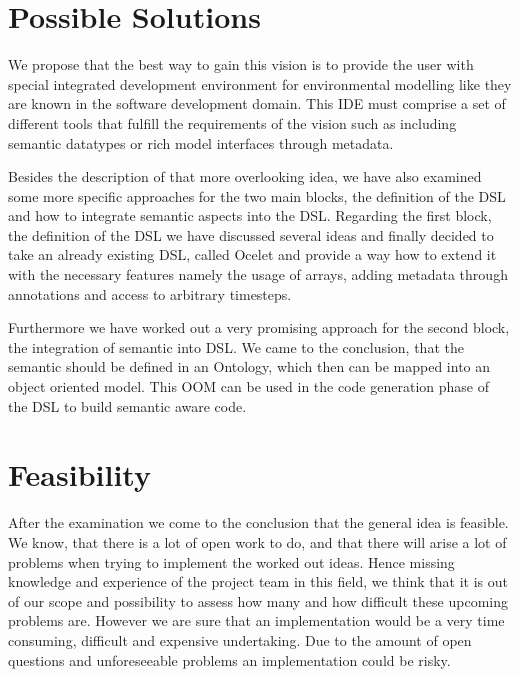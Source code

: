 \section*{Possible Solutions}
\par
We propose that the best way to gain this vision is to provide the user with special integrated development environment for environmental modelling like they are known in the software development domain. This IDE must comprise a set of different tools that fulfill the requirements of the vision such as including semantic datatypes or rich model interfaces through metadata.
\par
Besides the description of that more overlooking idea, we have also examined some more specific approaches for the two main blocks, the definition of the DSL and how to integrate semantic aspects into the DSL. Regarding the first block, the definition of the DSL we have discussed several ideas and finally decided to take an already existing DSL, called Ocelet and provide a way how to extend it with the necessary features namely the usage of arrays, adding metadata through annotations and access to arbitrary timesteps.
\par
Furthermore we have worked out a very promising approach for the second block, the integration of semantic into DSL. We came to the conclusion, that the semantic should be defined in an Ontology, which then can be mapped into an object oriented model. This OOM can be used in the code generation phase of the DSL to build semantic aware code.

\section*{Feasibility}
\par
After the examination we come to the conclusion that the general idea is feasible. We know, that there is a lot of open work to do, and that there will arise a lot of problems when trying to implement the worked out ideas. Hence missing knowledge and experience of the project team in this field, we think that it is out of our scope and possibility to assess how many and how difficult these upcoming problems are. However we are sure that an implementation would be a very time consuming, difficult and expensive undertaking. Due to the amount of open questions and unforeseeable problems an implementation could be risky. 







